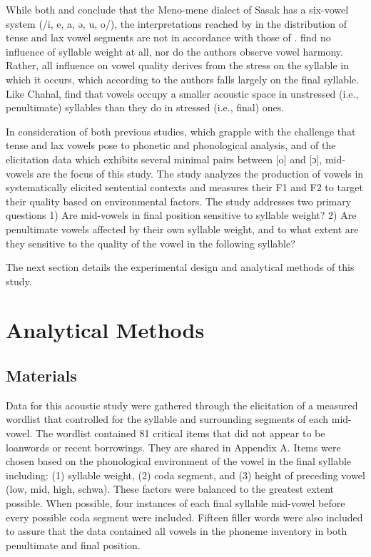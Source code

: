 \documentclass[12pt]{ouparticle}
\begin{document}
While both \citet{archangeli2018} and \citet{chahal1998} conclude that the Meno-mene dialect of Sasak has a six-vowel system (/i, e, a, ə, u, o/), the interpretations reached by \citet{archangeli2018} in the distribution of tense and lax vowel segments are not in accordance with those of \citet{chahal1998}. \citeauthor{archangeli2018} find no influence of syllable weight at all, nor do the authors observe vowel harmony. Rather, all influence on vowel quality derives from the stress on the syllable in which it occurs, which according to the authors falls largely on the final syllable. Like Chahal, \citeauthor{archangeli2018} find that vowels occupy a smaller acoustic space in unstressed (i.e., penultimate) syllables than they do in stressed (i.e., final) ones. 

In consideration of both previous studies, which grapple with the challenge that tense and lax vowels pose to phonetic and phonological analysis, and of the elicitation data which exhibits several minimal pairs between [o] and [ɔ], mid-vowels are the focus of this study. The study analyzes the production of vowels in systematically elicited sentential contexts and measures their F1 and F2 to target their quality based on environmental factors. The study addresses two primary questions 1) Are mid-vowels in final position sensitive to syllable weight? 2) Are penultimate vowels affected by their own syllable weight, and to what extent are they sensitive to the quality of the vowel in the following syllable? 

The next section details the experimental design and analytical methods of this study.


\section{Analytical Methods}\label{sec:methods}

\subsection{Materials}\label{sec:materials}

Data for this acoustic study were gathered through the elicitation of a measured wordlist that controlled for the syllable and surrounding segments of each mid-vowel. The wordlist contained 81 critical items that did not appear to be loanwords or recent borrowings. They are shared in Appendix A. Items were chosen based on the phonological environment of the vowel in the final syllable including: (1) syllable weight, (2) coda segment, and (3) height of preceding vowel (low, mid, high, schwa). These factors were balanced to the greatest extent possible. When possible, four instances of each final syllable mid-vowel before every possible coda segment were included. Fifteen filler words were also included to assure that the data contained all vowels in the phoneme inventory in both penultimate and final position.
\end{document}
